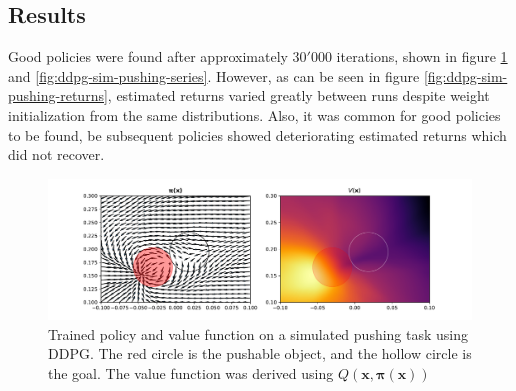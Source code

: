 \subsection{Results}

Good policies were found after approximately $30'000$ iterations, shown in
figure \ref{fig:ddpg-sim-pushing-pi-v} and \ref{fig:ddpg-sim-pushing-series}.
However, as can be seen in figure \ref{fig:ddpg-sim-pushing-returns}, estimated
returns varied greatly between runs despite weight initialization from the same
distributions. Also, it was common for good policies to be found, be
subsequent policies showed deteriorating estimated returns which did not
recover.

\begin{figure}[h!]
    \centering
    \includegraphics[width=1.0 \textwidth]{res/ddpg-pushing-pi-v.pdf}

    \caption{Trained policy and value function on a simulated pushing task
    using DDPG. The red circle is the pushable object, and the hollow circle is
    the goal. The value function was derived using $Q(\mathbf{x, \pi(x)})$}

    \label{fig:ddpg-sim-pushing-pi-v}

\end{figure}

